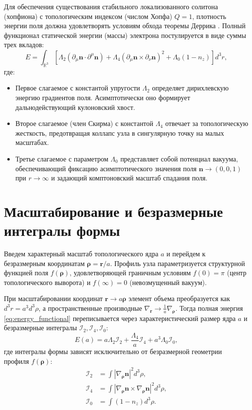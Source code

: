 \documentclass[12pt,a4paper]{article}
\begin{document}
Для обеспечения существования стабильного локализованного солитона (хопфиона) с топологическим индексом (числом Хопфа) $Q=1$, плотность энергии поля должна удовлетворять условиям обхода теоремы Деррика \cite{Derrick1964}. Полный функционал статической энергии (массы) электрона постулируется в виде суммы трех вкладов:
\begin{equation}
E = \int_{\mathbb{R}^3} \left[ \Lambda_2 (\partial_\mu \mathbf{n} \cdot \partial^\mu \mathbf{n}) + \Lambda_4 (\partial_\mu \mathbf{n} \times \partial_\nu \mathbf{n})^2 + \Lambda_0 (1 - n_z) \right] d^3r,
\label{eq:energy_functional}
\end{equation}
где:
\begin{itemize}
    \item Первое слагаемое с константой упругости $\Lambda_2$ определяет дирихлевскую энергию градиентов поля. Асимптотически оно формирует дальнодействующий кулоновский хвост.
    \item Второе слагаемое (член Скирма) с константой $\Lambda_4$ отвечает за топологическую жесткость, предотвращая коллапс узла в сингулярную точку на малых масштабах.
    \item Третье слагаемое с параметром $\Lambda_0$ представляет собой потенциал вакуума, обеспечивающий фиксацию асимптотического значения поля $\mathbf{n} \to (0,0,1)$ при $r \to \infty$ и задающий комптоновский масштаб спадания поля.
\end{itemize}

\section{Масштабирование и безразмерные интегралы формы}
Введем характерный масштаб топологического ядра $a$ и перейдем к безразмерным координатам $\boldsymbol{\rho} = \mathbf{r}/a$. Профиль узла параметризуется структурной функцией поля $f(\boldsymbol{\rho})$, удовлетворяющей граничным условиям $f(0) = \pi$ (центр топологического выворота) и $f(\infty) = 0$ (невозмущенный вакуум). 

При масштабировании координат $\mathbf{r} \to a\boldsymbol{\rho}$ элемент объема преобразуется как $d^3r = a^3 d^3\rho$, а пространственные производные $\nabla_{\mathbf{r}} \to \frac{1}{a} \nabla_{\boldsymbol{\rho}}$. Тогда полная энергия \eqref{eq:energy_functional} переписывается через характеристический размер ядра $a$ и безразмерные интегралы $\mathcal{I}_2, \mathcal{I}_4, \mathcal{I}_0$:
\begin{equation}
E(a) = a \Lambda_2 \mathcal{I}_2 + \frac{\Lambda_4}{a} \mathcal{I}_4 + a^3 \Lambda_0 \mathcal{I}_0,
\label{eq:energy_scaled}
\end{equation}
где интегралы формы зависят исключительно от безразмерной геометрии профиля $f(\boldsymbol{\rho})$:
\begin{align}
\mathcal{I}_2 &= \int |\nabla_{\boldsymbol{\rho}} \mathbf{n}|^2 d^3\rho, \\
\mathcal{I}_4 &= \int |\nabla_{\boldsymbol{\rho}} \mathbf{n} \times \nabla_{\boldsymbol{\rho}} \mathbf{n}|^2 d^3\rho, \\
\mathcal{I}_0 &= \int (1 - n_z) d^3\rho.
\end{align}
\end{document}
